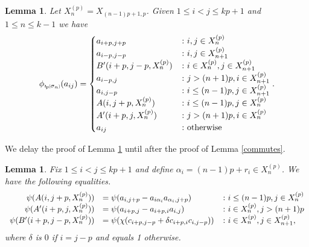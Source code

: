 \documentclass[11pt]{amsart}
\def\s{{\sigma}}
\def\a{\alpha}
\newcommand*{\subsmallp}[1]{\scalebox{.5}{\ensuremath#1}}
\newcommand{\subpp}[2][p]{\imath_{\hspace*{-1pt}#1}\hspace*{-.5pt}\subsmallp(#2\subsmallp)}
\newtheorem{lem}[thm]{Lemma}
\theoremstyle{definition}
\begin{document}
\begin{lem}\label{Sigma_n}
Let $X_n^{(p)} = X_{(n-1)p+1,p}$. Given $1\le i< j\le kp+1$ and $1\le n\le k-1$ we have
$$
\phi_{\subpp{\s_n}}(a_{ij}) =
\begin{cases}
       a_{i+p,j+p} &\colon i,j\in X_n^{(p)}\\
       a_{i-p,j-p} & \colon i,j\in X_{n+1}^{(p)}\\
       B'(i+p,j-p,X_n^{(p)}) & \colon i\in X_n^{(p)}, j\in X_{n+1}^{(p)}\\
       a_{i-p,j} &\colon j > (n+1)p, i\in X_{n+1}^{(p)}\\
       a_{i,j-p} & \colon i\le(n-1)p, j\in X_{n+1}^{(p)}\\
       A(i,j+p,X_n^{(p)}) & \colon i\le(n-1)p, j\in X_n^{(p)}\\
       A'(i+p,j,X_n^{(p)}) & \colon j> (n+1)p, i\in X_n^{(p)}\\
       a_{ij} & \colon \textnormal{otherwise}
\end{cases}.
$$
\end{lem}

We delay the proof of Lemma \ref{Sigma_n} until after the proof of Lemma \ref{commutes}.

\begin{lem}\label{SimplifiedImages}
Fix $1\le i< j\le kp+1$ and define $\a_i = (n-1)p+r_i\in X_n^{(p)}$. We have the following equalities.
  \[\begin{array}{r l l} \psi(A(i,j+p,X_n^{(p)}))   &= \psi(a_{i,j+p} - a_{i\a_i}a_{\a_i,j+p})      & \colon i\le(n-1)p, j\in X_n^{(p)}\\
                  \psi(A'(i+p,j,X_n^{(p)})) &= \psi(a_{i+p,j} - a_{i+p,i}a_{i,j})       & \colon i\in X_n^{(p)}, j>(n+1)p\\
                \psi(B'(i+p,j-p,X_n^{(p)})) &= \psi(\chi(c_{i+p,j-p} + \delta c_{i+p,i}c_{i,j-p})) & \colon i\in X_n^{(p)}, j\in X_{n+1}^{(p)},
  \end{array}\]
where $\delta$ is $0$ if $i=j-p$ and equals 1 otherwise.
\end{lem}
\end{document}
